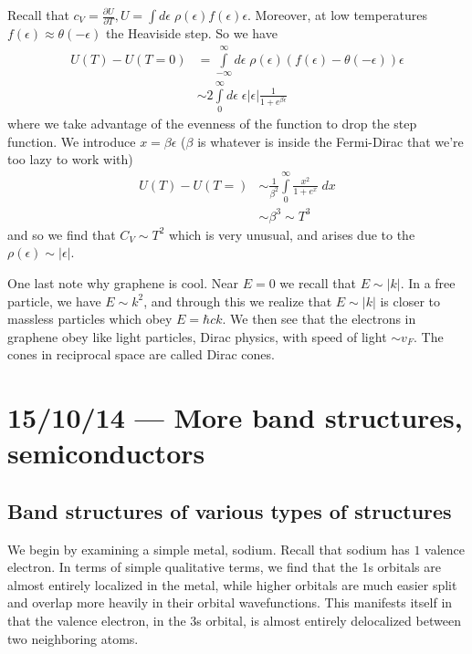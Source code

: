 \documentclass[10pt]{report}
\newcommand{\pd}[2]{\frac{\partial #1}{\partial#2}}
\newcommand{\abs}[1]{\left|#1\right|}
\begin{document}
\begin{enumerate}[1.]
        Recall that $c_V = \pd{U}{T}, U = \int d\epsilon\; \rho(\epsilon) f(\epsilon)\epsilon$. Moreover, at low temperatures $f(\epsilon) \approx \theta(-\epsilon)$ the Heaviside step. So we have
        \begin{align}
            U(T) - U(T=0) &= \int\limits_{-\infty}^{\infty}d\epsilon\;\rho(\epsilon) \left( f(\epsilon) - \theta(-\epsilon) \right)\epsilon\\
            &\sim 2\int\limits_0^{\infty}d\epsilon\;\epsilon\abs{\epsilon} \frac{1}{1 + e^{\beta\epsilon}}
        \end{align}
        where we take advantage of the evenness of the function to drop the step function. We introduce $x = \beta\epsilon$ ($\beta$ is whatever is inside the Fermi-Dirac that we're too lazy to work with)
        \begin{align}
            U(T) - U(T=) &\sim \frac{1}{\beta^2} \int\limits_{0}^{\infty}\frac{x^2}{1 + e^x}\;dx\\
            &\sim \beta^3 \sim T^3
        \end{align}
        and so we find that $C_V \sim T^2$ which is very unusual, and arises due to the $\rho(\epsilon) \sim \abs{\epsilon}$. 
\end{enumerate}

One last note why graphene is cool. Near $E=0$ we recall that $E \sim \abs{k}$. In a free particle, we have $E \sim k^2$, and through this we realize that $E\sim \abs{k}$ is closer to massless particles which obey $E=\hbar ck$. We then see that the electrons in graphene obey like light particles, Dirac physics, with speed of light $\sim v_F$. The cones in reciprocal space are called Dirac cones. 
\chapter{15/10/14 --- More band structures, semiconductors}

\section{Band structures of various types of structures}

We begin by examining a simple metal, sodium. Recall that sodium has $1$ valence electron. In terms of simple qualitative terms, we find that the 1s orbitals are almost entirely localized in the metal, while higher orbitals are much easier split and overlap more heavily in their orbital wavefunctions. This manifests itself in that the valence electron, in the 3s orbital, is almost entirely delocalized between two neighboring atoms. 
\end{document}
